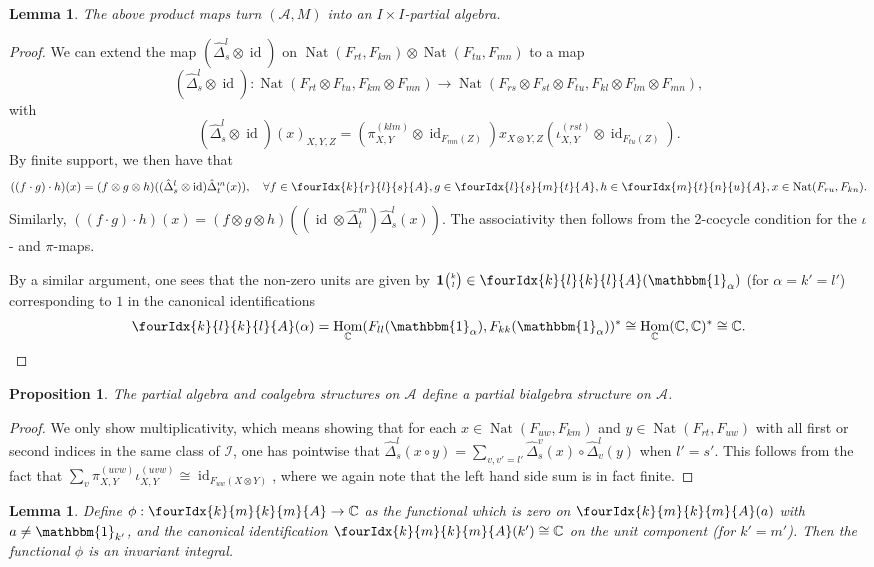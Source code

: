 \documentclass[10pt]{article}
\DeclareMathOperator{\id}{id}
\DeclareMathOperator{\Hom}{Hom}
\DeclareMathOperator{\Nat}{\mathrm{Nat}}
\newcommand{\C}{\mathbb{C}}
\newcommand{\Grt}[3]{#1{\tiny {\begin{pmatrix} #2\\#3\end{pmatrix}}}}
\newcommand{\Unitb}{\mathbbm{1}}
\newcommand{\UnitC}[2]{\Grt{\mathbf{1}}{#1}{#2}}
\newcommand{\Gr}[5]{\fourIdx{#2}{#4}{#3}{#5}{#1}}%
\newtheorem{Lem}[Theorem]{Lemma}
\newtheorem{Prop}[Theorem]{Proposition}
\theoremstyle{definition}
\numberwithin{equation}{section}
\begin{document}
\begin{Lem} The above product maps turn $(\mathscr{A},M)$ into an $I\times I$-partial algebra.
\end{Lem}
\begin{proof} We can extend the map $(\hat{\Delta}^l_s\otimes \id)$ on $\Nat(F_{rt},F_{km})\otimes \Nat(F_{tu},F_{mn})$ to a map \[(\hat{\Delta}^l_s\otimes \id): \Nat(F_{rt}\otimes F_{tu},F_{km}\otimes F_{mn}) \rightarrow  \Nat(F_{rs}\otimes F_{st}\otimes F_{tu},F_{kl}\otimes F_{lm}\otimes F_{mn}),\] with \[(\hat{\Delta}^l_s\otimes \id)(x)_{X,Y,Z} = \left(\pi^{(klm)}_{X,Y}\otimes \id_{F_{mn}(Z)}\right) x_{X\otimes Y, Z} \left(\iota^{(rst)}_{X,Y} \otimes \id_{F_{tu}(Z)}\right).\]
By finite support, we then have that \[((f\cdot g)\cdot h)(x) = (f\otimes g\otimes h)((\hat{\Delta}^l_s\otimes \id)\hat{\Delta}^m_t(x)), \quad \forall f\in \Gr{A}{k}{l}{r}{s},g\in \Gr{A}{l}{m}{s}{t},h\in \Gr{A}{m}{n}{t}{u}, x\in  \Nat(F_{ru},F_{kn}).\] Similarly, $((f\cdot g)\cdot h)(x) = (f\otimes g\otimes h)((\id\otimes \hat{\Delta}^m_t)\hat{\Delta}^l_s(x)).$ The associativity then follows from the 2-cocycle condition for the $\iota$- and $\pi$-maps. 

By a similar argument, one sees that the non-zero units are given by
$\UnitC{k}{l}\in \Gr{A}{k}{k}{l}{l}(\Unitb_{\alpha})$  (for
$\alpha=k'=l'$) corresponding to $1$ in the canonical
identifications  \[\Gr{A}{k}{k}{l}{l}(\alpha)
=\Hom_{\C}(F_{ll}(\Unitb_{\alpha}),F_{kk}(\Unitb_{\alpha}))^*\cong
\Hom_{\C}(\C,\C)^*  \cong \C. \qedhere\] 
\end{proof} 

\begin{Prop} The partial algebra and coalgebra structures on $\mathscr{A}$ define a partial bialgebra structure on $\mathscr{A}$. 
\end{Prop}
\begin{proof} We only show multiplicativity, which means showing that for each $x\in \Nat(F_{uw},F_{km})$ and $y\in \Nat(F_{rt},F_{uw})$ with all first or second indices in the same class of $\mathscr{I}$, one has pointwise that $\hat{\Delta}^l_s(x\circ y) = \sum_{v,v'=l'} \hat{\Delta}^v_s(x)\circ \hat{\Delta}^l_v(y)$ when  $l'=s'$. This follows from the fact that $\sum_v \pi^{(uvw)}_{X,Y}\iota^{(uvw)}_{X,Y} \cong \id_{F_{uw}(X\otimes Y)}$, where we again note that the left hand side sum is in fact finite.
\end{proof} 

\begin{Lem} Define $\phi: \Gr{A}{k}{k}{m}{m} \rightarrow \C$ as the functional which is zero on $\Gr{A}{k}{k}{m}{m}(a)$ with $a\neq \Unitb_{k'}$, and the canonical identification $\Gr{A}{k}{k}{m}{m}(k')\cong \C$ on the unit component (for $k'=m'$). Then the functional $\phi$ is an invariant integral.
\end{Lem}
\end{document}
